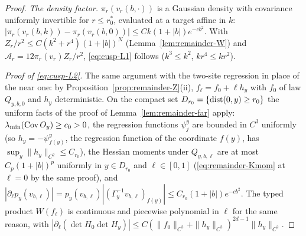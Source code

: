\begin{proof}
\emph{The density factor.} $\pi_r(v_r(b,\cdot))$ is a Gaussian density with covariance uniformly invertible for $r\le r_0^*$, evaluated at a target affine in $k$: $|\pi_r(v_r(b,k))-\pi_r(v_r(b,0))|\le Ck(1+|b|)e^{-cb^2}$. With $Z_r/r^2\le C(k^2+r^4)(1+|b|)^N$ (Lemma~\ref{lem:remainder-W}) and $\mathcal A_r=12\pi_r(v_r)Z_r/r^2$, \eqref{eq:cusp-L1} follows ($k^3\le k^2$, $kr^4\le kr^2$).

\emph{Proof of \eqref{eq:cusp-L2}.} The same argument with the two-site regression in place of the near one: by Proposition~\ref{prop:remainder-Z}(ii), $f_\ell=f_0+\ell h_y$ with $f_0$ of law $Q_{y,b,0}$ and $h_y$ deterministic. On the compact set $D_{r_0}=\{\operatorname{dist}(0,y)\ge r_0\}$ the uniform facts of the proof of Lemma~\ref{lem:remainder-far} apply: $\lambda_{\min}(\operatorname{Cov} O_y)\ge c_0>0$, the regression functions $\psi^y_j$ are bounded in $C^3$ uniformly (so $h_y=-\psi^y_{f(y)}$, the regression function of the coordinate $f(y)$, has $\sup_y\|h_y\|_{C^2}\le C_{r_0}$), the Hessian moments under $Q_{y,b,\ell}$ are at most $C_p(1+|b|)^p$ uniformly in $y\in D_{r_0}$ and $\ell\in[0,1]$ (\eqref{eq:remainder-Kmom} at $\ell=0$ by the same proof), and $|\partial_\ell p_y(v_{b,\ell})|=p_y(v_{b,\ell})|(\Gamma_y^{-1}v_{b,\ell})_{f(y)}|\le C_{r_0}(1+|b|)e^{-cb^2}$. The typed product $W(f_\ell)$ is continuous and piecewise polynomial in $\ell$ for the same reason, with $|\partial_\ell(\det H_0\det H_y)|\le C(\|f_0\|_{C^2}+\|h_y\|_{C^2})^{2d-1}\|h_y\|_{C^2}$.
\end{proof}

